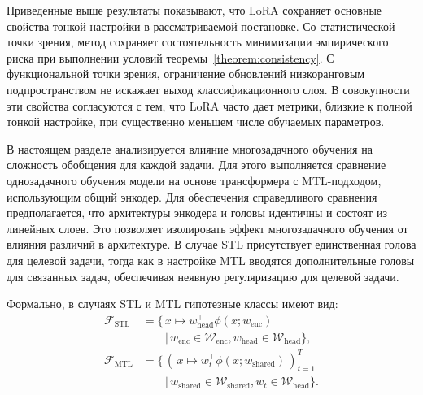 Приведенные выше результаты показывают, что LoRA сохраняет основные свойства тонкой настройки в рассматриваемой постановке.
Со статистической точки зрения, метод сохраняет состоятельность минимизации эмпирического риска при выполнении условий теоремы~\ref{theorem:consistency}.
С функциональной точки зрения, ограничение обновлений низкоранговым подпространством не искажает выход классификационного слоя.
В совокупности эти свойства согласуются с тем, что LoRA часто дает метрики, близкие к полной тонкой настройке, при существенно меньшем числе обучаемых параметров.

В настоящем разделе анализируется влияние многозадачного обучения на сложность обобщения для каждой задачи.
Для этого выполняется сравнение однозадачного обучения модели на основе трансформера с MTL-подходом, использующим общий энкодер.
Для обеспечения справедливого сравнения предполагается, что архитектуры энкодера и головы идентичны и состоят из линейных слоев.
Это позволяет изолировать эффект многозадачного обучения от влияния различий в архитектуре.
В случае STL присутствует единственная голова для целевой задачи, тогда как в настройке MTL вводятся дополнительные головы для связанных задач, обеспечивая неявную регуляризацию для целевой задачи.

Формально, в случаях STL и MTL гипотезные классы имеют вид:
\begin{align}
\mathcal{F}_{\mathrm{STL}}
&= \Big\{\, x \mapsto w_{\mathrm{head}}^\top \phi(x; w_{\mathrm{enc}}) \\
&\qquad \big|\, w_{\mathrm{enc}}\in\mathcal{W}_{\mathrm{enc}},
               w_{\mathrm{head}}\in\mathcal{W}_{\mathrm{head}} \Big\},
\\[4pt]
\mathcal{F}_{\mathrm{MTL}}
&= \Big\{\, (\,x \mapsto w_t^\top \phi(x; w_{\mathrm{shared}})\,)_{t=1}^T \\
&\qquad \big|\, w_{\mathrm{shared}}\in\mathcal{W}_{\mathrm{shared}},
               w_t\in\mathcal{W}_{\mathrm{head}} \Big\}.
\end{align}

